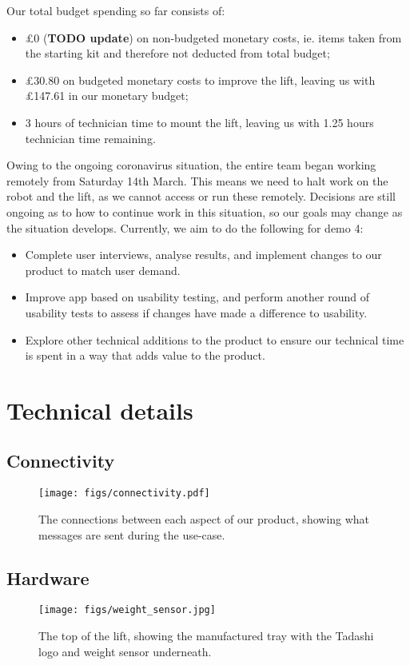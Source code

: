 \documentclass{article}
\begin{document}
Our total budget spending so far consists of:
\begin{itemize}
  \item \pounds 0 ({\bf TODO update}) on non-budgeted monetary costs, ie. items taken from the starting kit and therefore not deducted from total budget;
  \item \pounds 30.80 on budgeted monetary costs to improve the lift, leaving us with \pounds 147.61 in our monetary budget; 
  \item 3 hours of technician time to mount the lift, leaving us with 1.25 hours technician time remaining. 
\end{itemize}

Owing to the ongoing coronavirus situation, the entire team began working remotely from Saturday 14th March. This means we need to halt work on the robot and the lift, as we cannot access or run these remotely. Decisions are still ongoing as to how to continue work in this situation, so our goals may change as the situation develops. Currently, we aim to do the following for demo 4:
\begin{itemize}
  \item Complete user interviews, analyse results, and implement changes to our product to match user demand.
  \item Improve app based on usability testing, and perform another round of usability tests to assess if changes have made a difference to usability. 
  \item Explore other technical additions to the product to ensure our technical time is spent in a way that adds value to the product. 
\end{itemize}

\section{Technical details}
\subsection{Connectivity}
\begin{figure}
  \begin{center}
    \texttt{[image: figs/connectivity.pdf]}
  \end{center}
  \caption{The connections between each aspect of our product, showing what messages are sent during the use-case.}
\end{figure}
\subsection{Hardware}
\begin{figure}
  \begin{center}
    \texttt{[image: figs/weight\_sensor.jpg]}
    \caption{The top of the lift, showing the manufactured tray with the Tadashi logo and weight sensor underneath.}
  \label{fig:sensor}
  \end{center}
\end{figure}
\end{document}
